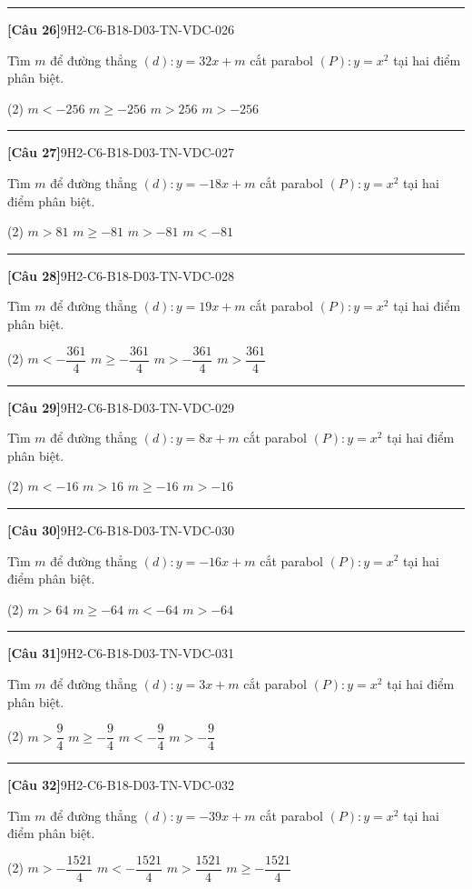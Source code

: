 \documentclass[12pt,a4paper]{article}
\newif\ifloigiai
\newenvironment{cauhoi}[2]{%
  \par\medskip\noindent\rule{\textwidth}{0.4pt}\par\nopagebreak
  \noindent\textbf{[#1]}\hfill{\scriptsize\ttfamily #2}\par\nopagebreak\smallskip}{\par}
\newcommand{\dapan}[1]{\ifloigiai\par\smallskip\noindent\textit{Đáp án:} \textbf{#1}\par\fi}
\begin{document}
\begin{cauhoi}{Câu 26}{9H2-C6-B18-D03-TN-VDC-026}
Tìm $m$ để đường thẳng $(d): y=32x+m$ cắt parabol $(P): y=x^{2}$ tại hai điểm phân biệt.
\begin{tasks}(2)
\task $m<-256$
\task $m\ge -256$
\task $m>256$
\task $m>-256$
\end{tasks}
\dapan{D}
\end{cauhoi}
\begin{cauhoi}{Câu 27}{9H2-C6-B18-D03-TN-VDC-027}
Tìm $m$ để đường thẳng $(d): y=-18x+m$ cắt parabol $(P): y=x^{2}$ tại hai điểm phân biệt.
\begin{tasks}(2)
\task $m>81$
\task $m\ge -81$
\task $m>-81$
\task $m<-81$
\end{tasks}
\dapan{C}
\end{cauhoi}
\begin{cauhoi}{Câu 28}{9H2-C6-B18-D03-TN-VDC-028}
Tìm $m$ để đường thẳng $(d): y=19x+m$ cắt parabol $(P): y=x^{2}$ tại hai điểm phân biệt.
\begin{tasks}(2)
\task $m<-\dfrac{361}{4}$
\task $m\ge -\dfrac{361}{4}$
\task $m>-\dfrac{361}{4}$
\task $m>\dfrac{361}{4}$
\end{tasks}
\dapan{C}
\end{cauhoi}
\begin{cauhoi}{Câu 29}{9H2-C6-B18-D03-TN-VDC-029}
Tìm $m$ để đường thẳng $(d): y=8x+m$ cắt parabol $(P): y=x^{2}$ tại hai điểm phân biệt.
\begin{tasks}(2)
\task $m<-16$
\task $m>16$
\task $m\ge -16$
\task $m>-16$
\end{tasks}
\dapan{D}
\end{cauhoi}
\begin{cauhoi}{Câu 30}{9H2-C6-B18-D03-TN-VDC-030}
Tìm $m$ để đường thẳng $(d): y=-16x+m$ cắt parabol $(P): y=x^{2}$ tại hai điểm phân biệt.
\begin{tasks}(2)
\task $m>64$
\task $m\ge -64$
\task $m<-64$
\task $m>-64$
\end{tasks}
\dapan{D}
\end{cauhoi}
\begin{cauhoi}{Câu 31}{9H2-C6-B18-D03-TN-VDC-031}
Tìm $m$ để đường thẳng $(d): y=3x+m$ cắt parabol $(P): y=x^{2}$ tại hai điểm phân biệt.
\begin{tasks}(2)
\task $m>\dfrac{9}{4}$
\task $m\ge -\dfrac{9}{4}$
\task $m<-\dfrac{9}{4}$
\task $m>-\dfrac{9}{4}$
\end{tasks}
\dapan{D}
\end{cauhoi}
\begin{cauhoi}{Câu 32}{9H2-C6-B18-D03-TN-VDC-032}
Tìm $m$ để đường thẳng $(d): y=-39x+m$ cắt parabol $(P): y=x^{2}$ tại hai điểm phân biệt.
\begin{tasks}(2)
\task $m>-\dfrac{1521}{4}$
\task $m<-\dfrac{1521}{4}$
\task $m>\dfrac{1521}{4}$
\task $m\ge -\dfrac{1521}{4}$
\end{tasks}
\dapan{A}
\end{cauhoi}
\end{document}
